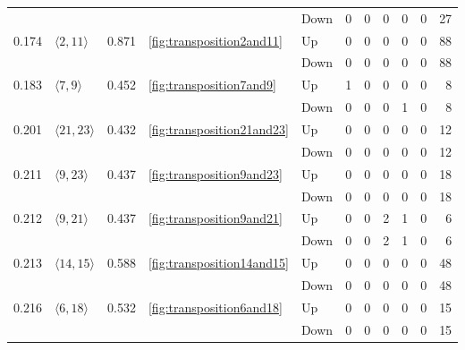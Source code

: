 \documentclass{article}
\begin{document}
\begin{center}
\begin{tabular}{lllllrrrrrr}
 &  &  &  & Down & 0 & 0 & 0 & 0 & 0 & 27 \\
\cline{1-11} \cline{2-11} \cline{3-11} \cline{4-11}
\multirow[t]{2}{*}{0.174} & \multirow[t]{2}{*}{$\langle2, 11\rangle$} & \multirow[t]{2}{*}{0.871} & \multirow[t]{2}{*}{\ref{fig:transposition2and11}} & Up & 0 & 0 & 0 & 0 & 0 & 88 \\
 &  &  &  & Down & 0 & 0 & 0 & 0 & 0 & 88 \\
\cline{1-11} \cline{2-11} \cline{3-11} \cline{4-11}
\multirow[t]{2}{*}{0.183} & \multirow[t]{2}{*}{$\langle7, 9\rangle$} & \multirow[t]{2}{*}{0.452} & \multirow[t]{2}{*}{\ref{fig:transposition7and9}} & Up & 1 & 0 & 0 & 0 & 0 & 8 \\
 &  &  &  & Down & 0 & 0 & 0 & 1 & 0 & 8 \\
\cline{1-11} \cline{2-11} \cline{3-11} \cline{4-11}
\multirow[t]{2}{*}{0.201} & \multirow[t]{2}{*}{$\langle21, 23\rangle$} & \multirow[t]{2}{*}{0.432} & \multirow[t]{2}{*}{\ref{fig:transposition21and23}} & Up & 0 & 0 & 0 & 0 & 0 & 12 \\
 &  &  &  & Down & 0 & 0 & 0 & 0 & 0 & 12 \\
\cline{1-11} \cline{2-11} \cline{3-11} \cline{4-11}
\multirow[t]{2}{*}{0.211} & \multirow[t]{2}{*}{$\langle9, 23\rangle$} & \multirow[t]{2}{*}{0.437} & \multirow[t]{2}{*}{\ref{fig:transposition9and23}} & Up & 0 & 0 & 0 & 0 & 0 & 18 \\
 &  &  &  & Down & 0 & 0 & 0 & 0 & 0 & 18 \\
\cline{1-11} \cline{2-11} \cline{3-11} \cline{4-11}
\multirow[t]{2}{*}{0.212} & \multirow[t]{2}{*}{$\langle9, 21\rangle$} & \multirow[t]{2}{*}{0.437} & \multirow[t]{2}{*}{\ref{fig:transposition9and21}} & Up & 0 & 0 & 2 & 1 & 0 & 6 \\
 &  &  &  & Down & 0 & 0 & 2 & 1 & 0 & 6 \\
\cline{1-11} \cline{2-11} \cline{3-11} \cline{4-11}
\multirow[t]{2}{*}{0.213} & \multirow[t]{2}{*}{$\langle14, 15\rangle$} & \multirow[t]{2}{*}{0.588} & \multirow[t]{2}{*}{\ref{fig:transposition14and15}} & Up & 0 & 0 & 0 & 0 & 0 & 48 \\
 &  &  &  & Down & 0 & 0 & 0 & 0 & 0 & 48 \\
\cline{1-11} \cline{2-11} \cline{3-11} \cline{4-11}
\multirow[t]{2}{*}{0.216} & \multirow[t]{2}{*}{$\langle6, 18\rangle$} & \multirow[t]{2}{*}{0.532} & \multirow[t]{2}{*}{\ref{fig:transposition6and18}} & Up & 0 & 0 & 0 & 0 & 0 & 15 \\
 &  &  &  & Down & 0 & 0 & 0 & 0 & 0 & 15 \\

\end{tabular}
\end{center}
\end{document}
